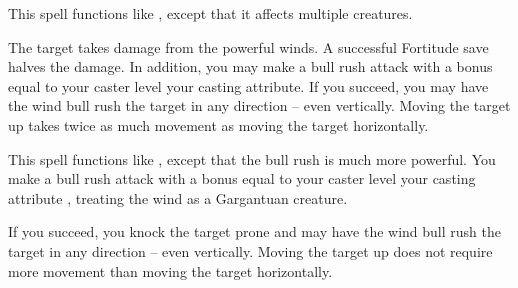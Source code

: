 \begin{spelleffect}
  This spell functions like , except that it affects multiple creatures.
\end{spelleffect}

\spellrng{\rngmed}
\begin{spelleffect}
  The target takes damage from the powerful winds. A successful Fortitude save halves the damage. In addition, you may make a bull rush attack with a bonus equal to your caster level \add your casting attribute. If you succeed, you may have the wind bull rush the target in any direction -- even vertically. Moving the target up takes twice as much movement as moving the target horizontally.
\end{spelleffect}

\begin{spelleffect}
  This spell functions like , except that the bull rush is much more powerful. You make a bull rush attack with a bonus equal to your caster level \add your casting attribute , treating the wind as a Gargantuan creature.
  
  If you succeed, you knock the target prone and may have the wind bull rush the target in any direction -- even vertically. Moving the target up does not require more movement than moving the target horizontally.
\end{spelleffect}

